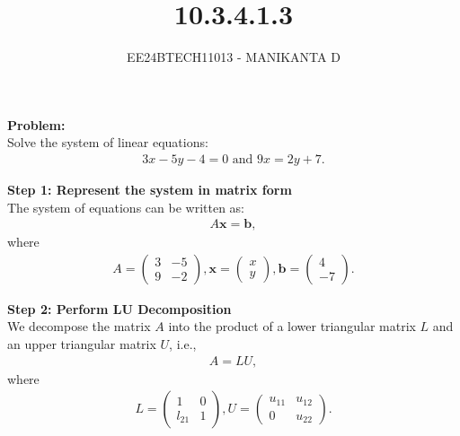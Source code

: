 \documentclass[journal]{IEEEtran}
\begin{document}

\vspace{3cm}

\title{10.3.4.1.3}
\author{EE24BTECH11013 - MANIKANTA D}
{\let\newpage\relax\maketitle}

\renewcommand{\thefigure}{\theenumi}
\renewcommand{\thetable}{\theenumi}
\setlength{\intextsep}{10pt} %

\renewcommand{\thetable}{\theenumi}
\textbf{Problem:}\\ 
Solve the system of linear equations:  
\begin{align}  
3x - 5y - 4 = 0 \text{ and } 9x = 2y + 7.  
\end{align}

\textbf{Step 1: Represent the system in matrix form} \\ 
The system of equations can be written as:  
\begin{align}  
A \mathbf{x} = \mathbf{b},  
\end{align}  
where  
\begin{align}  
A = \begin{pmatrix} 3 & -5 \\ 9 & -2 \end{pmatrix}, \mathbf{x} = \begin{pmatrix} x \\ y \end{pmatrix}, \mathbf{b} = \begin{pmatrix} 4 \\ -7 \end{pmatrix}.  
\end{align}

\textbf{Step 2: Perform LU Decomposition} \\ 
We decompose the matrix $A$ into the product of a lower triangular matrix $L$ and an upper triangular matrix $U$, i.e.,  
\begin{align}  
A = LU,  
\end{align}  
where  
\begin{align}  
L = \begin{pmatrix} 1 & 0 \\ l_{21} & 1 \end{pmatrix}, U = \begin{pmatrix} u_{11} & u_{12} \\ 0 & u_{22} \end{pmatrix}.  
\end{align}
\end{document}
